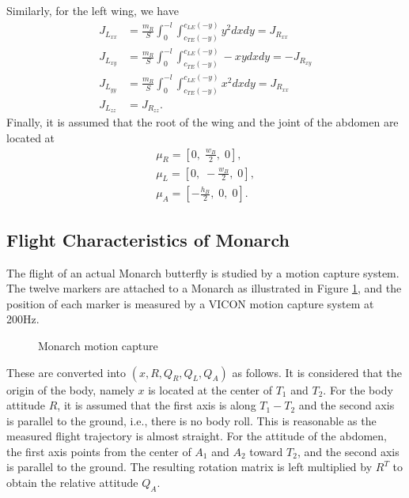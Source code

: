 \documentclass[conf]{new-aiaa}
\begin{document}
Similarly, for the left wing, we have
\begin{align*}
    J_{L_{xx}} & = \frac{m_R}{S} \int_0^{-l} \int_{c_{TE}(-y)}^{c_{LE}(-y)} y^2 dx dy = J_{R_{xx}} \\
    J_{L_{xy}} & = \frac{m_R}{S} \int_0^{-l} \int_{c_{TE}(-y)}^{c_{LE}(-y)} -xy dx dy = - J_{R_{xy}} \\
    J_{L_{yy}} & = \frac{m_R}{S} \int_0^{-l} \int_{c_{TE}(-y)}^{c_{LE}(-y)} x^2 dx dy = J_{R_{xx}} \\
    J_{L_{zz}} & = J_{R_{zz}}.
\end{align*}
Finally, it is assumed that the root of the wing and the joint of the abdomen are located at
\begin{align*}
    \mu_R = [0,\; \frac{w_B}{2},\; 0],\\
    \mu_L = [0,\; -\frac{w_B}{2},\; 0],\\
    \mu_A = [-\frac{h_B}{2},\; 0,\; 0].
\end{align*}

\subsection{Flight Characteristics of Monarch}

The flight of an actual Monarch butterfly is studied by a motion capture system. 
The twelve markers are attached to a Monarch as illustrated in Figure \ref{fig:Monarch_marker},
and the position of each marker is measured by a VICON motion capture system at 200\si{Hz}.

\begin{figure}
    \centerline{
        \hfill
}
\caption{Monarch motion capture}\label{fig:Monarch_marker}
\end{figure}


These are converted into $(x,R,Q_R,Q_L,Q_A)$ as follows. 
It is considered that the origin of the body, namely $x$ is located at the center of $T_1$ and $T_2$. 
For the body attitude $R$, it is assumed that the first axis is along $T_1-T_2$ and the second axis is parallel to the ground, i.e., there is no body roll. 
This is reasonable as the measured flight trajectory is almost straight. 
For the attitude of the abdomen, the first axis points from the center of $A_1$ and $A_2$ toward $T_2$, and the second axis is parallel to the ground. 
The resulting rotation matrix is left multiplied by $R^T$ to obtain the relative attitude $Q_A$. 
\end{document}
